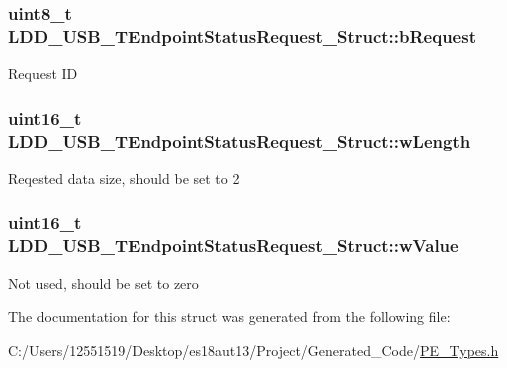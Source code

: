 \subsubsection[{b\+Request}]{\setlength{\rightskip}{0pt plus 5cm}uint8\+\_\+t L\+D\+D\+\_\+\+U\+S\+B\+\_\+\+T\+Endpoint\+Status\+Request\+\_\+\+Struct\+::b\+Request}\label{struct_l_d_d___u_s_b___t_endpoint_status_request___struct_ae8ab1e11dae5a0b3a4b4a7256a542175}
Request I\+D \hypertarget{struct_l_d_d___u_s_b___t_endpoint_status_request___struct_addba57e934f9c77c9159d7be618dd6dc}{}
\subsubsection[{w\+Length}]{\setlength{\rightskip}{0pt plus 5cm}uint16\+\_\+t L\+D\+D\+\_\+\+U\+S\+B\+\_\+\+T\+Endpoint\+Status\+Request\+\_\+\+Struct\+::w\+Length}\label{struct_l_d_d___u_s_b___t_endpoint_status_request___struct_addba57e934f9c77c9159d7be618dd6dc}
Reqested data size, should be set to 2 \hypertarget{struct_l_d_d___u_s_b___t_endpoint_status_request___struct_a987fe8c9322a22d8b5118eccd4de42c8}{}
\subsubsection[{w\+Value}]{\setlength{\rightskip}{0pt plus 5cm}uint16\+\_\+t L\+D\+D\+\_\+\+U\+S\+B\+\_\+\+T\+Endpoint\+Status\+Request\+\_\+\+Struct\+::w\+Value}\label{struct_l_d_d___u_s_b___t_endpoint_status_request___struct_a987fe8c9322a22d8b5118eccd4de42c8}
Not used, should be set to zero 

The documentation for this struct was generated from the following file\+:\begin{DoxyCompactItemize}
\item 
C\+:/\+Users/12551519/\+Desktop/es18aut13/\+Project/\+Generated\+\_\+\+Code/\hyperlink{_p_e___types_8h}{P\+E\+\_\+\+Types.\+h}\end{DoxyCompactItemize}
